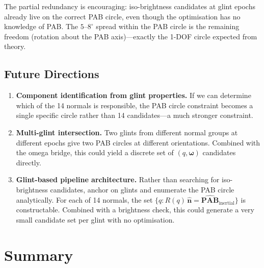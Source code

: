 \documentclass[11pt,a4paper]{article}
\begin{document}
The partial redundancy is encouraging: iso-brightness candidates at glint epochs already live on the correct PAB circle, even though the optimisation has no knowledge of PAB. The $5$--$8^\circ$ spread within the PAB circle is the remaining freedom (rotation about the PAB axis)---exactly the 1-DOF circle expected from theory.

\subsection{Future Directions}

\begin{enumerate}[leftmargin=2em]
  \item \textbf{Component identification from glint properties.} If we can determine which of the 14 normals is responsible, the PAB circle constraint becomes a single specific circle rather than 14 candidates---a much stronger constraint.
  \item \textbf{Multi-glint intersection.} Two glints from different normal groups at different epochs give two PAB circles at different orientations. Combined with the omega bridge, this could yield a discrete set of $(q, \boldsymbol{\omega})$ candidates directly.
  \item \textbf{Glint-based pipeline architecture.} Rather than searching for iso-brightness candidates, anchor on glints and enumerate the PAB circle analytically. For each of 14 normals, the set $\{q : R(q)\,\hat{\mathbf{n}} = \hat{\mathbf{PAB}}_{\mathrm{inertial}}\}$ is constructable. Combined with a brightness check, this could generate a very small candidate set per glint with no optimisation.
\end{enumerate}

\section{Summary}
\end{document}
